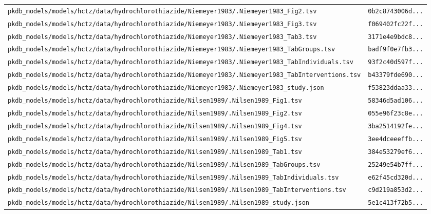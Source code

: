 \begin{longtable}{ll}
\texttt{pkdb\_models/models/hctz/data/hydrochlorothiazide/Niemeyer1983/.Niemeyer1983\_Fig2.tsv} & \texttt{0b2c8743006d...} \\
\texttt{pkdb\_models/models/hctz/data/hydrochlorothiazide/Niemeyer1983/.Niemeyer1983\_Fig3.tsv} & \texttt{f069402fc22f...} \\
\texttt{pkdb\_models/models/hctz/data/hydrochlorothiazide/Niemeyer1983/.Niemeyer1983\_Tab3.tsv} & \texttt{3171e4e9bdc8...} \\
\texttt{pkdb\_models/models/hctz/data/hydrochlorothiazide/Niemeyer1983/.Niemeyer1983\_TabGroups.tsv} & \texttt{badf9f0e7fb3...} \\
\texttt{pkdb\_models/models/hctz/data/hydrochlorothiazide/Niemeyer1983/.Niemeyer1983\_TabIndividuals.tsv} & \texttt{93f2c40d597f...} \\
\texttt{pkdb\_models/models/hctz/data/hydrochlorothiazide/Niemeyer1983/.Niemeyer1983\_TabInterventions.tsv} & \texttt{b43379fde690...} \\
\texttt{pkdb\_models/models/hctz/data/hydrochlorothiazide/Niemeyer1983/.Niemeyer1983\_study.json} & \texttt{f53823ddaa33...} \\
\texttt{pkdb\_models/models/hctz/data/hydrochlorothiazide/Nilsen1989/.Nilsen1989\_Fig1.tsv} & \texttt{58346d5ad106...} \\
\texttt{pkdb\_models/models/hctz/data/hydrochlorothiazide/Nilsen1989/.Nilsen1989\_Fig2.tsv} & \texttt{055e96f23c8e...} \\
\texttt{pkdb\_models/models/hctz/data/hydrochlorothiazide/Nilsen1989/.Nilsen1989\_Fig4.tsv} & \texttt{3ba2514192fe...} \\
\texttt{pkdb\_models/models/hctz/data/hydrochlorothiazide/Nilsen1989/.Nilsen1989\_Fig5.tsv} & \texttt{3ee4dceeeffb...} \\
\texttt{pkdb\_models/models/hctz/data/hydrochlorothiazide/Nilsen1989/.Nilsen1989\_Tab1.tsv} & \texttt{384e53279ef6...} \\
\texttt{pkdb\_models/models/hctz/data/hydrochlorothiazide/Nilsen1989/.Nilsen1989\_TabGroups.tsv} & \texttt{25249e54b7ff...} \\
\texttt{pkdb\_models/models/hctz/data/hydrochlorothiazide/Nilsen1989/.Nilsen1989\_TabIndividuals.tsv} & \texttt{e62f45cd320d...} \\
\texttt{pkdb\_models/models/hctz/data/hydrochlorothiazide/Nilsen1989/.Nilsen1989\_TabInterventions.tsv} & \texttt{c9d219a853d2...} \\
\texttt{pkdb\_models/models/hctz/data/hydrochlorothiazide/Nilsen1989/.Nilsen1989\_study.json} & \texttt{5e1c413f72b5...} \\

\end{longtable}
